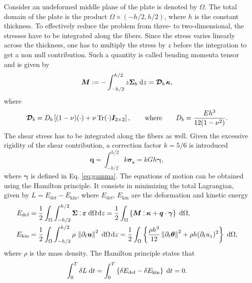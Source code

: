 Consider an undeformed middle plane of the plate is denoted by $\Omega$. The total domain of the plate is the product $\Omega \times (-h/2, h/2)$, where $h$ is the constant thickness. To effectively reduce the problem from three- to two-dimensional, the stresses have to be integrated along the fibers. Since the stress varies linearly across the thickness, one has to multiply the stress by $z$ before the integration to get a non null contribution. Such a quantity is called bending momenta tensor and is given by 
\begin{equation}\label{eq:momenta}
\bm{M} :=-\int_{-h/2}^{h/2} z \bm{\Sigma}_{b} \d{z} = \bm{\mathcal{D}}_{b} \, \bm{\kappa}, 
\end{equation}
where 
\begin{equation}\label{eq:Db}
\bm{\mathcal{D}}_{b} = D_b \left[ (1-\nu) (\cdot) + \nu \operatorname{Tr}(\cdot) \bm{I}_{2\times 2} \right], \qquad \text{where} \qquad D_b = \frac{E h^3}{12(1-\nu^2)}.
\end{equation}
The shear stress has to be integrated along the fibers as well. Given the excessive rigidity of the shear contribution, a correction factor $k=5/6$ \cite[Chapter 10]{reddy2006theory} is introduced 
\begin{equation}\label{eq:shearstress}
\bm{q} = \int_{-h/2}^{h/2} k \bm{\sigma_s} = kGh \bm{\gamma},
\end{equation}
where $\bm{\gamma}$ is defined in Eq. \eqref{eq:gamma}. The equations of motion can be obtained using the Hamilton principle. It consists in minimizing the total Lagrangian, given by $L = E_{\text{def}} - E_{\text{kin}}$, where $E_{\text{def}}, \, E_{\text{kin}}$ are the deformation  and kinetic energy
\begin{align}
E_{\text{def}} &= \frac{1}{2} \int_{\Omega} \int_{-h/2}^{h/2} \bm{\Sigma} \cddot \bm{\varepsilon} \d{\Omega} \d{z} = \frac{1}{2} \int_{\Omega} \left\{\bm{M} \cddot \bm{\kappa} + \bm{q} \cdot \bm{\gamma} \right\} \d{\Omega}, \label{eq:defenMin}\\
E_{\text{kin}} &= \frac{1}{2}  \int_{\Omega} \int_{-h/2}^{h/2} \rho \,  \norm{\partial_t \bm{u}}^2 \d{\Omega} \d{z} = \frac{1}{2} \int_{\Omega} \left\{\frac{\rho h^3}{12} \norm{\partial_t \bm{\theta}}^2 + \rho h (\partial_t u_z)^2  \right\} \d{\Omega}, \label{eq:kinenMin}
\end{align}
where $\rho$ is the mass density. The Hamilton principle states that 
\begin{equation*}
\int_{0}^{T} \delta L \d{t} = \int_{0}^{T} \left\{ \delta E_{\text{def}} - \delta E_{\text{kin}} \right\} \d{t} = 0.
\end{equation*}
